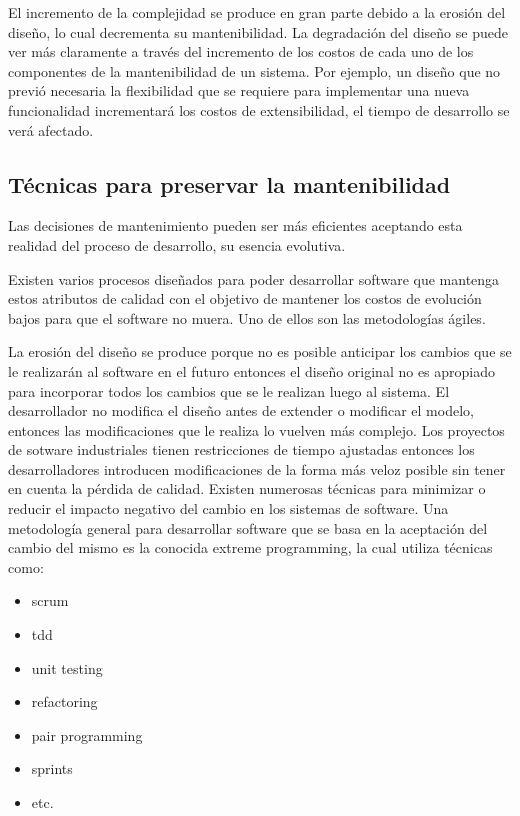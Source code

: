 El incremento de la complejidad se produce en gran parte debido a la erosión del diseño, lo cual
decrementa su mantenibilidad. La degradación del diseño se puede ver más claramente a través del
incremento de los costos de cada uno de los componentes de la mantenibilidad de un sistema. Por ejemplo,
un diseño que no previó necesaria la flexibilidad que se requiere para implementar una nueva funcionalidad
incrementará los costos de extensibilidad, el tiempo de desarrollo se verá afectado.


\subsection{Técnicas para preservar la mantenibilidad}

Las decisiones de mantenimiento pueden ser más eficientes aceptando esta realidad del proceso de
desarrollo, su esencia evolutiva. 



Existen varios procesos diseñados para poder desarrollar software que mantenga estos atributos 
de calidad con el objetivo de mantener los costos de evolución bajos para que el software no muera.
Uno de ellos son las metodologías ágiles.

La erosión del diseño se produce porque no es posible anticipar los cambios que se le realizarán al
software en el futuro entonces el diseño original no es apropiado para incorporar todos los cambios
que se le realizan luego al sistema. El desarrollador no modifica el diseño antes de extender o
modificar el modelo, entonces las modificaciones que le realiza lo vuelven más complejo. Los
proyectos de sotware industriales tienen restricciones de tiempo ajustadas entonces los desarrolladores
introducen modificaciones de la forma más veloz posible sin tener en cuenta la pérdida de calidad.
Existen numerosas técnicas para minimizar o reducir el impacto negativo del cambio en los sistemas
de software. Una metodología general para desarrollar software que se basa en la aceptación del
cambio del mismo es la conocida
extreme programming, la cual utiliza técnicas como:

\begin{itemize}
    \item scrum
    \item tdd
    \item unit testing
    \item refactoring
    \item pair programming
    \item sprints
    \item etc.
\end{itemize}

